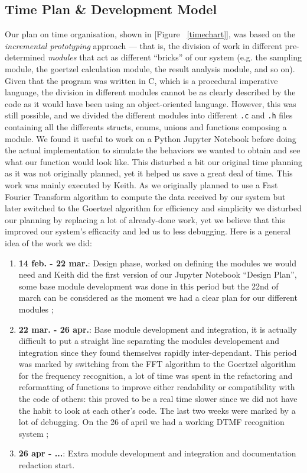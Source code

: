 \documentclass{cce2014-design}
\begin{document}
\subsection{Time Plan \& Development Model}
Our plan on time organisation, shown in [Figure ~\ref{timechart}], was based on
the \textit{incremental prototyping} approach \cite{Incremental-Prototype} — 
that is, the division of work in different pre-determined \textit{modules} 
that act as different ``bricks'' of our system (e.g. the sampling module, the 
goertzel calculation module, the result analysis module, and so on). Given that 
the program was written in C, which is a procedural imperative language, the 
division in different modules cannot be as clearly described by the code as it 
would have been using an object-oriented language. However, this was still 
possible, and we divided the different modules into different \texttt{.c} and 
\texttt{.h} files containing all the differents structs, enums, unions and 
functions composing a module. We found it useful to work on a Python Jupyter 
Notebook before doing the actual implementation to simulate the behaviors we 
wanted to obtain and see what our function would look like. This disturbed a 
bit our original time planning as it was not originally planned, yet it helped 
us save a great deal of time. This work was mainly executed by Keith. As we 
originally planned to use a Fast Fourier Transform algorithm to compute the 
data received by our system but later switched to the Goertzel algorithm for 
efficiency and simplicity we disturbed our planning by replacing a lot of 
already-done work, yet we believe that this improved our system's efficacity 
and led us to less debugging. Here is a general idea of the work we did:
\begin{enumerate}
    \item \textbf{14 feb. - 22 mar.}: Design phase, worked on defining the
        modules we would need and Keith did the first version of our Jupyter
        Notebook ``Design Plan'', some base module development was done
        in this period but the 22nd of march can be considered as the moment we
        had a clear plan for our different modules ;
	\item \textbf{22 mar. - 26 apr.}: Base module development and integration,
        it is actually difficult to put a straight line separating the modules
        developement and integration since they found themselves rapidly
        inter-dependant. This period was marked by switching from the FFT
        algorithm to the Goertzel algorithm for the frequency recognition, a lot
        of time was spent in the refactoring and reformatting of functions to
        improve either readability or compatibility with the code of others:
        this proved to be a real time slower since we did not have the habit to
        look at each other's code. The last two weeks were marked by a lot of
        debugging. On the 26 of april we had a working DTMF recognition system ;
	\item \textbf{26 apr - ...}: Extra module development and integration and
        documentation redaction start.
\end{enumerate}
\end{document}
